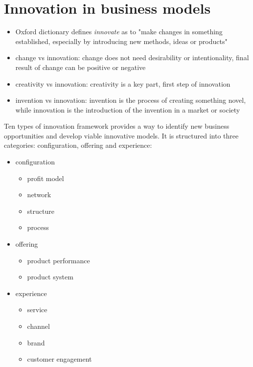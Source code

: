 \section{Innovation in business models}
\begin{itemize}
	\item Oxford dictionary defines \textit{innovate} as to "make changes
	in something established, especially by introducing new methods, ideas
	or products"
	\item change vs innovation: change does not need desirability or
	intentionality, final result of change can be positive or negative
	\item creativity vs innovation: creativity is a key part, first step
	of innovation
	\item invention vs innovation: invention is the process of creating
	something novel, while innovation is the introduction of the invention
	in a market or society
\end{itemize}

Ten types of innovation framework provides a way to identify new business
opportunities and develop viable innovative models. It is structured into
three categories: configuration, offering and experience:

\begin{itemize}
	\item configuration
	\begin{itemize}
		\item profit model
		\item network
		\item structure
		\item process
	\end{itemize}
	\item offering
	\begin{itemize}
		\item product performance
		\item product system
	\end{itemize}
	\item experience
	\begin{itemize}
		\item service
		\item channel
		\item brand
		\item customer engagement
	\end{itemize}
\end{itemize}
